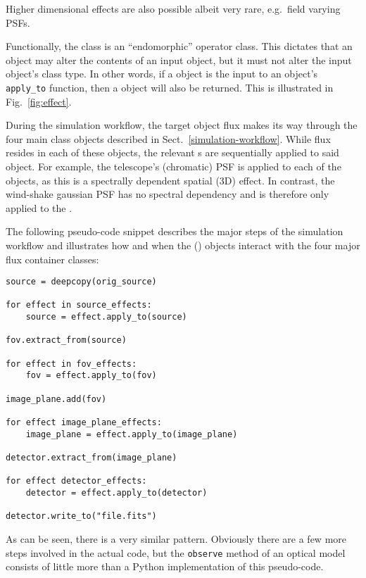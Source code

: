Higher dimensional effects are also possible albeit very rare,
e.g.~field varying PSFs.

Functionally, the \Effect{} class is an ``endomorphic'' operator
class.  This dictates that an \Effect{} object may alter the contents
of an input object, but it must not alter the input object's class
type.  In other words, if a \Source{} object is the input to an
\Effect{} object's \lstinline{apply_to} function, then a \Source{}
object will also be returned.  This is illustrated in
Fig.~\ref{fig:effect}.

During the simulation workflow, the target object flux makes its way
through the four main class objects described in
Sect.~\ref{simulation-workflow}.  While flux resides in each of these
objects, the relevant \Effect{}s are sequentially applied to said
object.  For example, the telescope's (chromatic) PSF is applied to
each of the \FieldOfView{} objects, as this is a spectrally dependent
spatial (3D) effect.  In contrast, the wind-shake gaussian PSF has no
spectral dependency and is therefore only applied to the
\ImagePlane{}.

The following pseudo-code snippet describes the major steps of the
simulation workflow and illustrates how and when the \Effect() objects
interact with the four major flux container classes:

\begin{lstlisting}[frame=single]
source = deepcopy(orig_source)

for effect in source_effects:
    source = effect.apply_to(source)

fov.extract_from(source)

for effect in fov_effects:
    fov = effect.apply_to(fov)

image_plane.add(fov)

for effect image_plane_effects:
    image_plane = effect.apply_to(image_plane)

detector.extract_from(image_plane)

for effect detector_effects:
    detector = effect.apply_to(detector)

detector.write_to("file.fits")
\end{lstlisting}

As can be seen, there is a very similar pattern.  Obviously there are
a few more steps involved in the actual \ScopeSim{} code, but the
\lstinline{observe} method of an optical model consists of little more
than a Python implementation of this pseudo-code.

